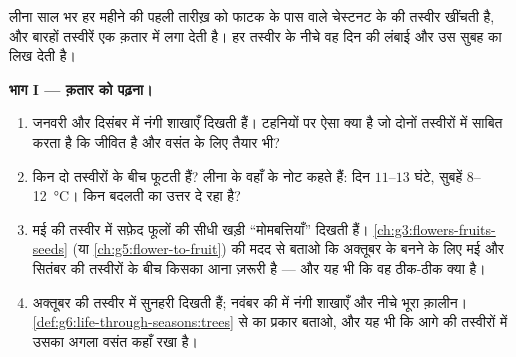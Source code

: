 \begin{problem}\label{pb:g6:life-through-seasons:1}
लीना साल भर हर महीने की पहली तारीख़ को फाटक के पास वाले चेस्टनट के 
की तस्वीर खींचती है, और बारहों तस्वीरें एक क़तार में लगा देती है। हर
तस्वीर के नीचे वह दिन की लंबाई और उस सुबह का  लिख देती है।

\medskip\noindent\textbf{भाग I --- क़तार को पढ़ना।}
\begin{enumerate}
  \item जनवरी और दिसंबर में नंगी शाखाएँ दिखती हैं। टहनियों पर ऐसा क्या
        है जो दोनों तस्वीरों में साबित करता है कि  जीवित है और
        वसंत के लिए तैयार भी?
  \item {} किन दो तस्वीरों के बीच फूटती हैं? लीना के वहाँ के नोट
        कहते हैं: दिन $11$--$13$ घंटे, सुबहें
        $8$--\qty{12}{\degreeCelsius}।  किन बदलती
         का उत्तर दे रहा है?
  \item मई की तस्वीर में सफ़ेद फूलों की सीधी खड़ी ``मोमबत्तियाँ''
        दिखती हैं। \cref{ch:g3:flowers-fruits-seeds} (या
        \cref{ch:g5:flower-to-fruit}) की मदद से बताओ कि अक्तूबर के 
        बनने के लिए मई और सितंबर की तस्वीरों के बीच किसका आना ज़रूरी है
        --- और यह भी कि वह  ठीक-ठीक क्या है।
  \item अक्तूबर की तस्वीर में सुनहरी  दिखती हैं; नवंबर की में
        नंगी शाखाएँ और नीचे भूरा क़ालीन।
        \cref{def:g6:life-through-seasons:trees} से  का प्रकार
        बताओ, और यह भी कि आगे की तस्वीरों में उसका अगला वसंत कहाँ
        रखा है।
\end{enumerate}


\end{problem}
